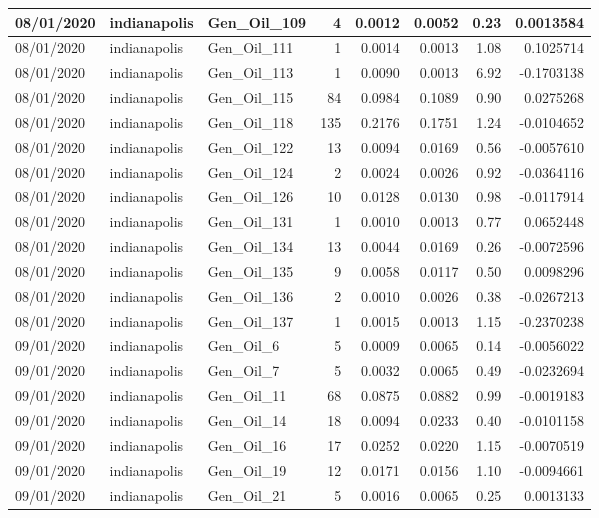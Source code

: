 \documentclass[
  letterpaper,
  DIV=11,
  numbers=noendperiod]{scrartcl}
\begin{document}
\begin{tabular}{l|l|l|r|r|r|r|r}
\hline
08/01/2020 & indianapolis & Gen\_Oil\_109 & 4 & 0.0012 & 0.0052 & 0.23 & 0.0013584\\
\hline
08/01/2020 & indianapolis & Gen\_Oil\_111 & 1 & 0.0014 & 0.0013 & 1.08 & 0.1025714\\
\hline
08/01/2020 & indianapolis & Gen\_Oil\_113 & 1 & 0.0090 & 0.0013 & 6.92 & -0.1703138\\
\hline
08/01/2020 & indianapolis & Gen\_Oil\_115 & 84 & 0.0984 & 0.1089 & 0.90 & 0.0275268\\
\hline
08/01/2020 & indianapolis & Gen\_Oil\_118 & 135 & 0.2176 & 0.1751 & 1.24 & -0.0104652\\
\hline
08/01/2020 & indianapolis & Gen\_Oil\_122 & 13 & 0.0094 & 0.0169 & 0.56 & -0.0057610\\
\hline
08/01/2020 & indianapolis & Gen\_Oil\_124 & 2 & 0.0024 & 0.0026 & 0.92 & -0.0364116\\
\hline
08/01/2020 & indianapolis & Gen\_Oil\_126 & 10 & 0.0128 & 0.0130 & 0.98 & -0.0117914\\
\hline
08/01/2020 & indianapolis & Gen\_Oil\_131 & 1 & 0.0010 & 0.0013 & 0.77 & 0.0652448\\
\hline
08/01/2020 & indianapolis & Gen\_Oil\_134 & 13 & 0.0044 & 0.0169 & 0.26 & -0.0072596\\
\hline
08/01/2020 & indianapolis & Gen\_Oil\_135 & 9 & 0.0058 & 0.0117 & 0.50 & 0.0098296\\
\hline
08/01/2020 & indianapolis & Gen\_Oil\_136 & 2 & 0.0010 & 0.0026 & 0.38 & -0.0267213\\
\hline
08/01/2020 & indianapolis & Gen\_Oil\_137 & 1 & 0.0015 & 0.0013 & 1.15 & -0.2370238\\
\hline
09/01/2020 & indianapolis & Gen\_Oil\_6 & 5 & 0.0009 & 0.0065 & 0.14 & -0.0056022\\
\hline
09/01/2020 & indianapolis & Gen\_Oil\_7 & 5 & 0.0032 & 0.0065 & 0.49 & -0.0232694\\
\hline
09/01/2020 & indianapolis & Gen\_Oil\_11 & 68 & 0.0875 & 0.0882 & 0.99 & -0.0019183\\
\hline
09/01/2020 & indianapolis & Gen\_Oil\_14 & 18 & 0.0094 & 0.0233 & 0.40 & -0.0101158\\
\hline
09/01/2020 & indianapolis & Gen\_Oil\_16 & 17 & 0.0252 & 0.0220 & 1.15 & -0.0070519\\
\hline
09/01/2020 & indianapolis & Gen\_Oil\_19 & 12 & 0.0171 & 0.0156 & 1.10 & -0.0094661\\
\hline
09/01/2020 & indianapolis & Gen\_Oil\_21 & 5 & 0.0016 & 0.0065 & 0.25 & 0.0013133\\

\end{tabular}
\end{document}
